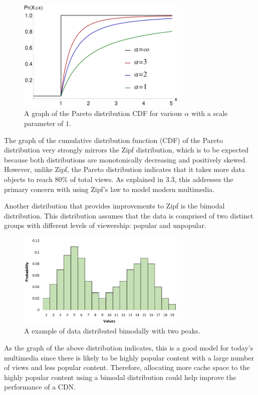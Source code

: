 \documentclass[
	a4paper, %
	10pt, %
	unnumberedsections, %
	twoside, %
]{LTJournalArticle}
\begin{document}
\begin{figure}[h]
	\begin{center}
		\includegraphics[width=8.1cm]{pareto.png}
	\end{center}
	\caption{A graph of the Pareto distribution CDF for various $\alpha$ with a scale parameter of $1$.}	
\end{figure}

The graph of the cumulative distribution function (CDF) of the Pareto distribution very strongly mirrors the Zipf distribution, which is to be expected because both distributions are monotonically decreasing and positively skewed. However, unlike Zipf, the Pareto distribution indicates that it takes more data objects to reach 80\% of total views. As explained in $3.3$, this addresses the primary concern with using Zipf's law to model modern multimedia. 

Another distribution that provides improvements to Zipf is the bimodal distribution. This distribution assumes that the data is comprised of two distinct groups with different levels of viewership: popular and unpopular. 

\begin{figure}[h]
	\begin{center}
		\includegraphics[width=8.1cm]{bimodal.png}
	\end{center}
	\caption{A example of data distributed bimodally with two peaks.}	
\end{figure}


As the graph of the above distribution indicates, this is a good model for today's multimedia since there is likely to be highly popular content with a large number of views and less popular content. Therefore, allocating more cache space to the highly popular content using a bimodal distribution could help improve the performance of a CDN.
\end{document}
